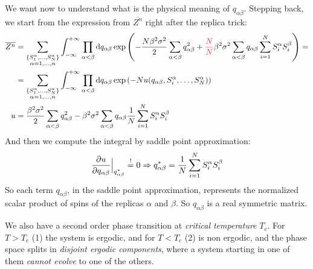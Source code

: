 \documentclass[../template.tex]{subfiles}
\begin{document}
We want now to understand what is the physical meaning of $q_{\alpha \beta}$. Stepping back, we start from the expression from $\overline{Z^n}$ right after the replica trick:
\begin{align*}
    \overline{Z^n} &= \sum_{\substack{\{S_1^\alpha,\dots,S_N^\alpha\}\\ \alpha=1,\dots,n}} \int_{-\infty}^{+\infty} \prod_{\alpha < \beta} \dd{q_{\alpha \beta}} \exp\left(-\frac{N \beta^2 \sigma^2}{2} \sum_{\alpha < \beta} q_{\alpha \beta}^2 + \textcolor{Red}{\frac{N}{N} } \beta^2 \sigma^2 \sum_{\alpha < \beta} q_{\alpha \beta} \sum_{i=1}^N S_i^\alpha S_i^\beta \right) =\\
    &= \sum_{\substack{\{S_1^\alpha,\dots,S_N^\alpha\}\\ \alpha=1,\dots,n}} \int_{-\infty}^{+\infty} \prod_{\alpha < \beta} \dd{q_{\alpha \beta}} \exp\left(-N u(q_{\alpha \beta}, S_i^\alpha,\dots, S_N^\alpha)\right)\\
    u &= \frac{\beta^2 \sigma^2}{2} \sum_{\alpha < \beta} q_{\alpha \beta}^2 - \beta^2 \sigma^2 \sum_{\alpha < \beta} q_{\alpha \beta}\frac{1}{N} \sum_{i=1}^N S_i^\alpha S_i^\beta  
\end{align*}  
And then we compute the integral by saddle point approximation:
\begin{align*}
    \pdv{u}{q_{\alpha \beta}} (q_{\alpha \beta})\Big|_{q_{\alpha \beta}^*} \overset{!}{=} 0 \Rightarrow q_{\alpha \beta}^* = \frac{1}{N} \sum_{i=1}^N S_i^\alpha S_i^\beta 
\end{align*}
So each term $q_{\alpha \beta}$, in the saddle point approximation, represents the normalized scalar product of spins of the replicas $\alpha$ and $\beta$. So $q_{\alpha \beta}$ is a real symmetric matrix.

We also have a second order phase transition at \textit{critical temperature} $T_c$. For $T > T_c$ (1) the system is ergodic, and for $T < T_c$ (2) is non ergodic, and the phase space splits in \textit{disjoint ergodic components}, where a system starting in one of them \textit{cannot evolve} to one of the others.
\end{document}
